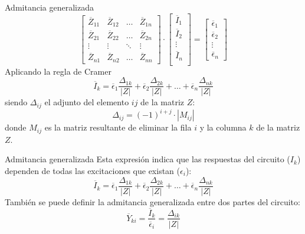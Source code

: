 \documentclass[aspectratio=169, usenames,svgnames,dvipsnames]{beamer}
\begin{document}
\begin{frame}[label={sec:orgb0fc1b8}]{Admitancia generalizada}
\begin{equation*}
  \begin{bmatrix}
    \overline{Z}_{11} & \overline{Z}_{12} & \dots & \overline{Z}_{1n} \\
    \overline{Z}_{21} & \overline{Z}_{22} & \dots & \overline{Z}_{2n} \\
    \vdots & \vdots & \ddots & \vdots \\
    \overline{Z}_{n1} & \overline{Z}_{n2} &  \dots & \overline{Z}_{nn}
  \end{bmatrix} \cdot %
  \begin{bmatrix}
    \overline{I}_1\\
    \overline{I}_2\\
    \vdots \\
    \overline{I}_n\\
  \end{bmatrix} = %
  \begin{bmatrix}
    \overline{\epsilon}_1\\
    \overline{\epsilon}_2\\
    \vdots \\
    \overline{\epsilon}_n
  \end{bmatrix}
\end{equation*}
Aplicando la regla de Cramer
\[
  \overline{I}_k = \overline{\epsilon}_1 \frac{\Delta_{1k}}{|Z|} + \overline{\epsilon}_2 \frac{\Delta_{2k}}{|Z|} + \dots + \overline{\epsilon}_n \frac{\Delta_{nk}}{|Z|}
\]
siendo \(\Delta_{ij}\) el adjunto del elemento \(ij\) de la matriz \(Z\):
\[
  \Delta_{ij} = (-1)^{i+j} \cdot |M_{ij}|
\]
donde \(M_{ij}\) es la matriz resultante de eliminar la fila \(i\) y la columna \(k\) de la matriz \(Z\).
\end{frame}

\begin{frame}[label={sec:org246071c}]{Admitancia generalizada}
Esta expresión indica que las respuestas del circuito (\(I_k\)) dependen de todas las excitaciones que existan (\(\epsilon_i\)):
\[
  \overline{I}_k = \overline{\epsilon}_1 \frac{\Delta_{1k}}{|Z|} + \overline{\epsilon}_2 \frac{\Delta_{2k}}{|Z|} + \dots + \overline{\epsilon}_n \frac{\Delta_{nk}}{|Z|}
\]
También se puede definir la admitancia generalizada entre dos partes del circuito:
\[
  \overline{Y}_{ki} = \frac{\overline{I}_k}{\overline{\epsilon}_i} = \frac{\Delta_{ik}}{|Z|}
\]
\end{frame}
\end{document}
